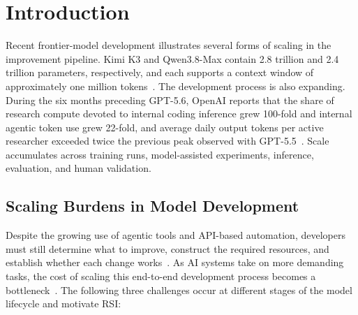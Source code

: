 







\section{Introduction}


Recent frontier-model development illustrates several forms of scaling in the improvement pipeline. Kimi K3 and Qwen3.8-Max contain 2.8 trillion and 2.4 trillion parameters, respectively, and each supports a context window of approximately one million tokens~\cite{moonshot2026kimik3,alibaba2026qwen38max}. The development process is also expanding. During the six months preceding GPT-5.6, OpenAI reports that the share of research compute devoted to internal coding inference grew 100-fold and internal agentic token use grew 22-fold, and average daily output tokens per active researcher exceeded twice the previous peak observed with GPT-5.5~\cite{openai2026gpt56}. Scale accumulates across training runs, model-assisted experiments, inference, evaluation, and human validation.

\subsection{Scaling Burdens in Model Development}

Despite the growing use of agentic tools and API-based automation, developers must still determine what to improve, construct the required resources, and establish whether each change works~\cite{nvidia2025aimo,meta_capacity_efficiency_2026}. As AI systems take on more demanding tasks, the cost of scaling this end-to-end development process becomes a bottleneck~\cite{openai2025gdpval,phan2025hle,swebench,yao2024tau}. The following three challenges occur at different stages of the model lifecycle and motivate RSI:



